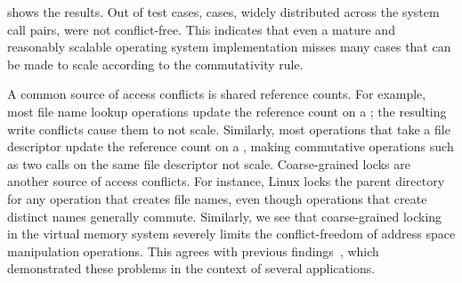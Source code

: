  shows the results.
Out of  test cases,
 cases, widely distributed across the
system call pairs, were not conflict-free.
This indicates that even a mature and reasonably scalable operating system
implementation misses many cases that can be made to scale according
to the commutativity rule.

A common source of access conflicts is shared reference counts.
%
For example, most file name lookup operations update the reference
count on a ; the resulting write conflicts cause
them to not scale.
%
Similarly, most operations that take a file descriptor update the
reference count on a , making
commutative operations such as two  calls on the
same file descriptor not scale.
Coarse-grained locks are another source of access conflicts.  For
instance, Linux locks the parent directory for any operation that
creates file names, even though operations that create distinct names
generally commute.
%
%
Similarly, we see that coarse-grained locking in the virtual memory
system severely limits the conflict-freedom of address space manipulation
operations. This agrees with previous
findings~\cite{boyd-wickizer:scaling,clements:radixvm,clements:bonsai},
which demonstrated these problems in the context of several applications.


